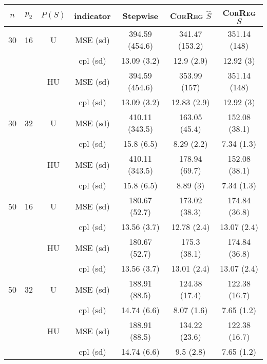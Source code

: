\documentclass[11pt,a4paper]{article}
\begin{document}
\begin{table}[h!]
\centering
\begin{tabular}{|c|c|c|c|c|c|c|}
\hline 
$n$ & $p_2$&  $P(S)$ &indicator &Stepwise  &    \textsc{CorReg} $\hat S$& \textsc{CorReg} $S$\\ 
\hline %
30 & 16 & U&MSE (sd) & 394.59 (454.6) & 341.47 (153.2) & 351.14 (148) \\
& & & cpl (sd) & 13.09 (3.2) & 12.9 (2.9) & 12.92 (3) \\
 &  &HU &MSE (sd) & 394.59 (454.6) & 353.99 (157) & 351.14 (148) \\
& & & cpl (sd) & 13.09 (3.2) & 12.83 (2.9) & 12.92 (3) \\
\hline %
30 & 32 & U & MSE (sd) & 410.11 (343.5) & 163.05 (45.4) & 152.08 (38.1) \\
& & & cpl (sd) & 15.8 (6.5) & 8.29 (2.2) & 7.34 (1.3) \\
 &  & HU & MSE (sd) & 410.11 (343.5) & 178.94 (69.7) & 152.08 (38.1) \\
& & & cpl (sd) & 15.8 (6.5) & 8.89 (3) & 7.34 (1.3) \\
\hline
\hline %
50 & 16 & U&	MSE (sd) & 180.67 (52.7) & 173.02 (38.3) & 174.84 (36.8) \\
& & & cpl (sd) & 13.56 (3.7) & 12.78 (2.4) & 13.07 (2.4) \\
 &  &HU &MSE (sd) & 180.67 (52.7) & 175.3 (38.1) & 174.84 (36.8) \\
& & & cpl (sd) & 13.56 (3.7) & 13.01 (2.4) & 13.07 (2.4) \\
\hline %
50 & 32 & U&MSE (sd) & 188.91 (88.5) & 124.38 (17.4) & 122.38 (16.7) \\
& & & cpl (sd) & 14.74 (6.6) & 8.07 (1.6) & 7.65 (1.2) \\
 &  &HU &MSE (sd) & 188.91 (88.5) & 134.22 (23.6) & 122.38 (16.7) \\
& & &cpl (sd) & 14.74 (6.6) & 9.5 (2.8) & 7.65 (1.2) \\

\end{tabular}
\end{table}
\end{document}
